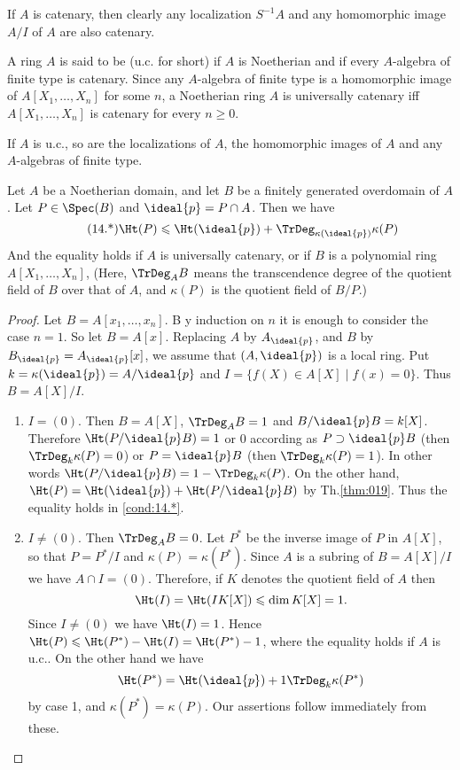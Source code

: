 \documentclass[../main]{subfiles}
\begin{document}
If $A$ is catenary, then clearly any localization $S^{-1}A$ and any homomorphic image $A / I$ of $A$ are also catenary.

A ring $A$ is said to be  (u.c. for short) if $A$ is Noetherian and if every $A$-algebra of finite type is catenary. Since any $A$-algebra of finite type is a homomorphic image of $A[X_1, \ldots, X_n]$ for some $n$, a Noetherian ring $A$ is universally catenary iff $A[X_1, \ldots, X_n]$ is catenary for every $n \geqslant 0$.

If $A$ is u.c., so are the localizations of $A$, the homomorphic images of $A$ and any $A$-algebras of finite type.

\begin{partheorem}\label{thm:023}
Let $A$ be a Noetherian domain, and let $B$ be a finitely generated overdomain of $A$. Let $P \in \Spec(B)$ and $\ideal{p}=P \cap A$. Then we have
\[\tag{14.*}\label{cond:14.*}\Ht(P) \leqslant \Ht(\ideal{p})+\TrDeg_{\kappa(\ideal{p})}\kappa(P)\]
And the equality holds if $A$ is universally catenary, or if $B$ is a polynomial ring $A[X_1, \ldots, X_n]$, (Here, $\TrDeg_AB$ means the transcendence degree of the quotient field of $B$ over that of $A$, and $\kappa(P)$ is the quotient field of $B / P$.)
\end{partheorem}

\begin{proof}
Let $B=A[x_1, \ldots, x_n]$. B y induction on $n$ it is enough to consider the case $n=1$. So let $B=A[x]$. Replacing $A$ by $A_{\ideal{p}}$, and $B$ by $B_{\ideal{p}}=A_{\ideal{p}}[x]$, we assume that $(A, \ideal{p})$ is a local ring. Put $k=\kappa(\ideal{p})=A / \ideal{p}$ and $I=\{f(X) \in A[X] \mid f(x)=0\}$. Thus $B=A[X]/I$.
\begin{enumerate}[label = Case \arabic*.]
    \item $I=(0)$. Then $B=A[X]$, $\TrDeg_AB=1$ and $B / \ideal{p}B=k[X]$. Therefore $\Ht(P / \ideal{p}B)=1$ or $0$ according as $P \supset \ideal{p}B$ (then $\TrDeg_k\kappa(P)=0$) or $P=\ideal{p}B$ (then $\TrDeg_k\kappa(P)=1$). In other words $\Ht(P/\ideal{p}B)=1-\TrDeg_k\kappa(P)$. On the other hand, $\Ht(P)=\Ht(\ideal{p})+\Ht(P / \ideal{p} B)$ by Th.\ref{thm:019}. Thus the equality holds in \ref{cond:14.*}.
    \item $I \neq(0)$. Then $\TrDeg_AB=0$. Let $P^*$ be the inverse image of $P$ in $A[X]$, so that $P=P^*/I$ and $\kappa(P)=\kappa(P^*)$. Since $A$ is a subring of $B=A[X]/I$ we have $A \cap I=(0)$. Therefore, if $K$ denotes the quotient field of $A$ then \[\Ht(I)=\Ht(IK[X]) \leqslant \dim K[X]=1.\] Since $I \neq(0)$ we have $\Ht(I)=1$. Hence $\Ht(P) \leqslant \Ht(P^*)-\Ht(I)=\Ht(P^*)-1$, where the equality holds if $A$ is u.c.. On the other hand we have \[\Ht(P^*)=\Ht(\ideal{p})+1\TrDeg_k\kappa(P^*)\] by case 1, and $\kappa(P^*)=\kappa(P)$. Our assertions follow immediately from these.
\end{enumerate}
\end{proof}
\end{document}
